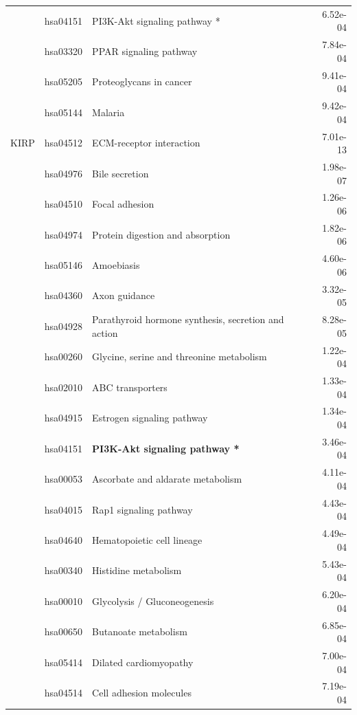 \begin{longtable}{cllr}
 & hsa04151 & \textcolor{\clrnew}{PI3K-Akt signaling pathway *}& 6.52e-04 \\ 
 & hsa03320 & \textcolor{\clrnew}{PPAR signaling pathway} & 7.84e-04 \\ 
 & hsa05205 & \textcolor{\clrnew}{Proteoglycans in cancer} & 9.41e-04 \\ 
 & hsa05144 & \textcolor{\clrnew}{Malaria} & 9.42e-04 \\ 
\midrule 
\rowcolor{\clrmatch}KIRP & hsa04512 & ECM-receptor interaction & 7.01e-13\\ 
 & hsa04976 & \textcolor{\clrnew}{Bile secretion} & 1.98e-07 \\ 
 \rowcolor{\clrmatch}& hsa04510 & Focal adhesion & 1.26e-06 \\ 
 \rowcolor{\clrmatch}& hsa04974 & Protein digestion and absorption & 1.82e-06 \\ 
 & hsa05146 & \textcolor{\clrnew}{Amoebiasis} & 4.60e-06 \\ 
 & hsa04360 & \textcolor{\clrnew}{Axon guidance} & 3.32e-05 \\ 
 & hsa04928 & \textcolor{\clrnew}{Parathyroid hormone synthesis, secretion and action} & 8.28e-05 \\ 
 & hsa00260 & \textcolor{\clrnew}{Glycine, serine and threonine metabolism} & 1.22e-04 \\ 
 & hsa02010 & \textcolor{\clrnew}{ABC transporters} & 1.33e-04 \\ 
 & hsa04915 & \textcolor{\clrnew}{Estrogen signaling pathway} & 1.34e-04 \\ 
 & hsa04151 & \textcolor{\clrnew}{\textbf{PI3K-Akt signaling pathway *}} & 3.46e-04 \\ 
 & hsa00053 & \textcolor{\clrnew}{Ascorbate and aldarate metabolism} & 4.11e-04 \\ 
 & hsa04015 & \textcolor{\clrnew}{Rap1 signaling pathway} & 4.43e-04 \\ 
 & hsa04640 & \textcolor{\clrnew}{Hematopoietic cell lineage} & 4.49e-04 \\ 
 & hsa00340 & \textcolor{\clrnew}{Histidine metabolism} & 5.43e-04 \\ 
 & hsa00010 & \textcolor{\clrnew}{Glycolysis / Gluconeogenesis} & 6.20e-04 \\ 
 & hsa00650 & \textcolor{\clrnew}{Butanoate metabolism} & 6.85e-04 \\ 
 & hsa05414 & \textcolor{\clrnew}{Dilated cardiomyopathy} & 7.00e-04 \\ 
 & hsa04514 & \textcolor{\clrnew}{Cell adhesion molecules} & 7.19e-04 \\ 

\end{longtable}
